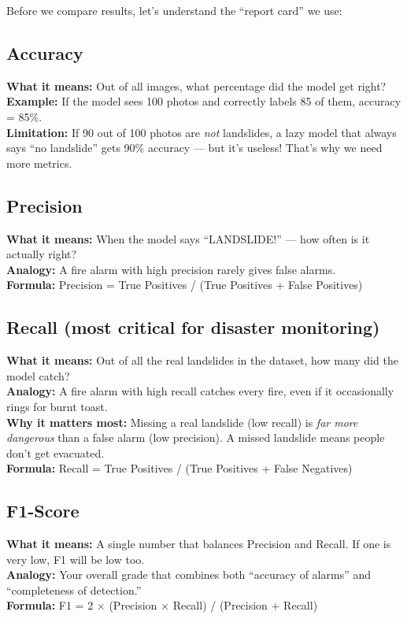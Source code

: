 \documentclass[11pt]{article}
\begin{document}
Before we compare results, let's understand the ``report card'' we use:

\subsection{Accuracy}
\textbf{What it means:} Out of all images, what percentage did the model get right?\\
\textbf{Example:} If the model sees 100 photos and correctly labels 85 of them, accuracy = 85\%.\\
\textbf{Limitation:} If 90 out of 100 photos are \emph{not} landslides, a lazy model that always says ``no landslide'' gets 90\% accuracy --- but it's useless! That's why we need more metrics.

\subsection{Precision}
\textbf{What it means:} When the model says ``LANDSLIDE!'' --- how often is it actually right?\\
\textbf{Analogy:} A fire alarm with high precision rarely gives false alarms.\\
\textbf{Formula:} Precision = True Positives / (True Positives + False Positives)

\subsection{Recall (most critical for disaster monitoring)}
\textbf{What it means:} Out of all the real landslides in the dataset, how many did the model catch?\\
\textbf{Analogy:} A fire alarm with high recall catches every fire, even if it occasionally rings for burnt toast.\\
\textbf{Why it matters most:} Missing a real landslide (low recall) is \emph{far more dangerous} than a false alarm (low precision). A missed landslide means people don't get evacuated.\\
\textbf{Formula:} Recall = True Positives / (True Positives + False Negatives)

\subsection{F1-Score}
\textbf{What it means:} A single number that balances Precision and Recall. If one is very low, F1 will be low too.\\
\textbf{Analogy:} Your overall grade that combines both ``accuracy of alarms'' and ``completeness of detection.''\\
\textbf{Formula:} F1 = 2 $\times$ (Precision $\times$ Recall) / (Precision + Recall)
\end{document}
